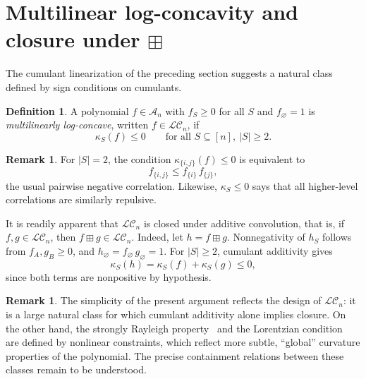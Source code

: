 \documentclass[11pt]{amsart}
\theoremstyle{definition}
\newtheorem{defn}[thm]{Definition}
\newtheorem{remark}[thm]{Remark}
\begin{document}
\section{Multilinear log-concavity and closure under
\texorpdfstring{$\boxplus$}{additive convolution}}
\label{sec:logconcave}

The cumulant linearization of the preceding section suggests a
natural class defined by sign conditions on cumulants.

\begin{defn} \label{def:LC}
A polynomial $f\in\mathcal{A}_n$ with $f_S\ge 0$ for all $S$ and $f_\varnothing = 1$ is \emph{multilinearly log-concave}, written $f\in\mathcal{LC}_n$, if
\begin{equation}\label{eq:LC}
  \kappa_S(f)\le 0
  \qquad\text{for all } S\subseteq[n],\ |S|\ge 2.
\end{equation}
\end{defn}

\begin{remark}\label{rem:LC-interpretation}
For $|S|=2$, the condition $\kappa_{\{i,j\}}(f)\le 0$ is
equivalent to
\[
  f_{\{i,j\}} \le f_{\{i\}}\, f_{\{j\}},
\]
the usual pairwise negative correlation. Likewise,
$\kappa_S\le 0$ says that all higher-level correlations are similarly
repulsive.
\end{remark}

\bigskip

It is readily apparent that $\mathcal{LC}_n$ is closed under additive convolution, that is, if $f,g\in\mathcal{LC}_n$, then $f\boxplus g\in\mathcal{LC}_n$. Indeed, let $h = f\boxplus g$. Nonnegativity of $h_S$ follows from $f_A,g_B\ge 0$, and $h_\varnothing = f_\varnothing\, g_\varnothing = 1$.  For $|S|\ge 2$, cumulant additivity gives
\[
  \kappa_S(h) = \kappa_S(f) + \kappa_S(g) \le 0,
\]
since both terms are nonpositive by hypothesis.

\begin{remark}
    The simplicity of the present argument reflects the design of $\mathcal{LC}_n$: it is a large natural class for which cumulant additivity alone implies closure. On the other hand, the strongly Rayleigh property~\cite{BBL09} and the Lorentzian condition~\cite{BH20} are defined by nonlinear constraints, which reflect more subtle, ``global'' curvature properties of the polynomial. The precise containment relations between these classes remain to be understood.
\end{remark}
\end{document}
